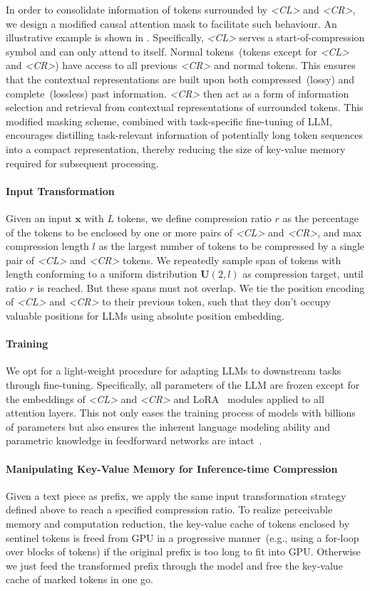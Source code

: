 In order to consolidate information of tokens surrounded by \textit{<CL>} and \textit{<CR>}, we design a modified causal attention mask to facilitate such behaviour. An illustrative example is shown in . 
Specifically, \textit{<CL>} serves a start-of-compression symbol and can only attend to itself. Normal tokens~(tokens except for \textit{<CL>} and \textit{<CR>}) have access to all previous \textit{<CR>} and normal tokens. This ensures that the contextual representations are built upon both compressed~(lossy) and complete~(lossless) past information. \textit{<CR>} then act as a form of information selection and retrieval from contextual representations of surrounded tokens. This modified masking scheme, combined with task-specific fine-tuning of LLM, encourages distilling task-relevant information of potentially long token sequences into a compact representation, thereby reducing the size of key-value memory required for subsequent processing.

\paragraph{Input Transformation} Given an input $\bm{x}$ with $L$ tokens, 
we define compression ratio $r$ as the percentage of the tokens
to be enclosed by one or more pairs of \textit{<CL>} and \textit{<CR>},
and max compression length $l$ as 
 the largest number of tokens to be compressed by a single pair of 
\textit{<CL>} and \textit{<CR>} tokens. 
We repeatedly sample span of tokens with length conforming to a uniform distribution $\bm{U}(2,l)$ as compression target, until ratio $r$ is reached. 
But these spans must not overlap. 
We tie the position encoding of \textit{<CL>} and \textit{<CR>} to their previous token, such that they don't occupy valuable positions for 
LLMs using absolute position embedding.

\paragraph{Training} We opt for a light-weight procedure for adapting LLMs to downstream tasks through fine-tuning. 
Specifically, all parameters of the LLM are frozen except for the embeddings 
of \textit{<CL>} and \textit{<CR>} and LoRA~\cite{lora} modules applied to 
all attention layers. This not only eases the training process of models 
with billions of parameters but also ensures the inherent language modeling 
ability and parametric knowledge in feedforward networks are 
intact~\cite{keyvalue}.
\paragraph{Manipulating Key-Value Memory for Inference-time Compression} 
Given a text piece as prefix, we apply the same input transformation strategy defined above to reach a specified compression ratio. To realize perceivable memory and computation reduction, the key-value cache of tokens enclosed by sentinel tokens is freed from GPU in a progressive manner~(e.g., using a for-loop over blocks of tokens) if the original prefix is too long to fit into GPU. Otherwise we just feed the transformed prefix through the model and free the key-value cache of marked tokens in one go.